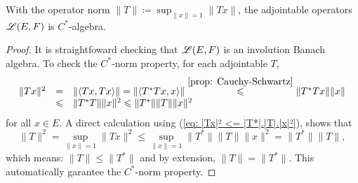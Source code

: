 \begin{proposicao}
    With the operator norm $\|T\| \coloneqq \sup_{\|x\|=1} \|Tx\|$, the adjointable operators $\mathscr L(E,F)$ is $C^*$-algebra.
    \begin{proof}
    It is straightfoward checking that $\mathscr L(E,F)$ is an involution Banach algebra. To check the $C^*$-norm property, for each adjointable $T$,
    \begin{equation}
    \label{eq: |Tx|² <= |T*|.|T|.|x|²}
        \begin{array}{rcl}
            \|Tx\|^2 &=& \|\langle {Tx},{Tx}\rangle\| = \|\langle {T^*Tx},{x}\rangle\| \overset{\ref{prop: Cauchy-Schwartz}}{\leqslant} \|T^*Tx\|\|x\| \\
            &\leqslant & \|T^*T\|\|x\|^2 \leqslant \|T^*\|\|T\| \|x\|^2 
        \end{array}
    \end{equation}
    for all $x\in E$. A direct calculation using (\ref{eq: |Tx|² <= |T*|.|T|.|x|²}), shows that
    \[
    \|T\|^2 = \sup_{\|x\|=1} \|Tx\|^2 \leq \sup_{\|x\|=1} \|T^*\|\|T\|\|x\|^2 = \|T^*\|\|T\|,
    \]
    which means: $\|T\| \leq \|T^*\|$ and by extension, $\|T\|=\|T^*\|$. This automatically garantee the $C^*$-norm property.
    \end{proof}
\end{proposicao}
    
